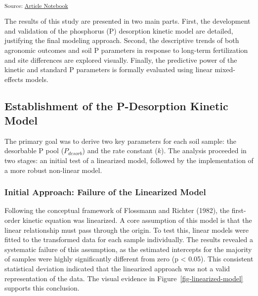 \documentclass[
  a4paper,
]{article}
\begin{document}
\textsubscript{Source:
\href{https://Andrapodon.github.io/Master-Thesis-P-kinetics/index.qmd.html}{Article
Notebook}}

The results of this study are presented in two main parts. First, the
development and validation of the phosphorus (P) desorption kinetic
model are detailed, justifying the final modeling approach. Second, the
descriptive trends of both agronomic outcomes and soil P parameters in
response to long-term fertilization and site differences are explored
visually. Finally, the predictive power of the kinetic and standard P
parameters is formally evaluated using linear mixed-effects models.

\subsection{Establishment of the P-Desorption Kinetic
Model}\label{establishment-of-the-p-desorption-kinetic-model}

The primary goal was to derive two key parameters for each soil sample:
the desorbable P pool (\(P_{desorb}\)) and the rate constant (\(k\)).
The analysis proceeded in two stages: an initial test of a linearized
model, followed by the implementation of a more robust non-linear model.

\subsubsection{Initial Approach: Failure of the Linearized
Model}\label{initial-approach-failure-of-the-linearized-model}

Following the conceptual framework of Flossmann and Richter (1982), the
first-order kinetic equation was linearized. A core assumption of this
model is that the linear relationship must pass through the origin. To
test this, linear models were fitted to the transformed data for each
sample individually. The results revealed a systematic failure of this
assumption, as the estimated intercepts for the majority of samples were
highly significantly different from zero (p \textless{} 0.05). This
consistent statistical deviation indicated that the linearized approach
was not a valid representation of the data. The visual evidence in
Figure~\ref{fig-linearized-model} supports this conclusion.
\end{document}
